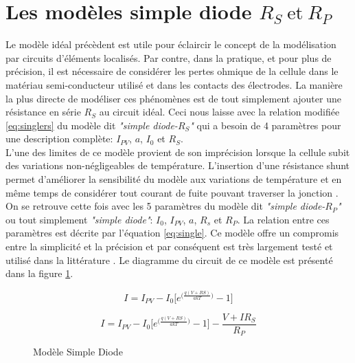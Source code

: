 \section{Les modèles simple diode \texorpdfstring{$R_S\ \text{et}\ R_P$}{Rs et Rp}}
Le modèle idéal précèdent est utile pour éclaircir le concept de la modélisation par circuits d'éléments localisés. Par contre, dans la pratique, et pour plus de précision, il est nécessaire de considérer les pertes ohmique de la cellule dans le matériau semi-conducteur utilisé et dans les contacts des électrodes. La manière la plus directe de modéliser ces phénomènes est de tout simplement ajouter une résistance en série $R_S$ au circuit idéal. Ceci nous laisse avec la relation modifiée \ref{eq:singlers} du modèle dit \textit{"simple diode-$R_S$"} qui a besoin de 4 paramètres pour une description complète: $I_{PV}$, $a$, $I_0$ et $R_S$.\\
L'une des limites de ce modèle provient de son imprécision lorsque la cellule subit des variations non-négligeables de température. L'insertion d'une résistance shunt permet d'améliorer la sensibilité du modèle aux variations de température et en même temps de considérer tout courant de fuite pouvant traverser la jonction \cite{Chin2015b}. On se retrouve cette fois avec les 5 paramètres du modèle dit \textit{"simple diode-$R_P$"} ou tout simplement \textit{"simple diode"}: $I_0$, $I_{PV}$, $a$, $R_s$ et $R_P$. La relation entre ces paramètres est décrite par l'équation \ref{eq:single}. Ce modèle offre un compromis entre la simplicité et la précision et par conséquent est très largement testé et utilisé dans la littérature \cite{Carrero2007}. Le diagramme du circuit de ce modèle est présenté dans la figure \ref{fig:single}.

\begin{equation}
  \label{eq:singlers}
  I = I_{PV} - I_0 \bigg[e^{\big(\frac{q(V + RS)}{akT}\big)} - 1\bigg]
\end{equation}

\begin{equation}
  \label{eq:single}
  I = I_{PV} - I_0 \bigg[e^{\big(\frac{q(V + RS)}{akT}\big)} - 1\bigg] - \frac{V + I R_S}{R_P}
\end{equation}

\begin{figure}
  \begin{center}
    \shorthandoff{:!}
    \shorthandon{:!}
    \caption{Modèle Simple Diode}
    \label{fig:single}
  \end{center}
\end{figure}



